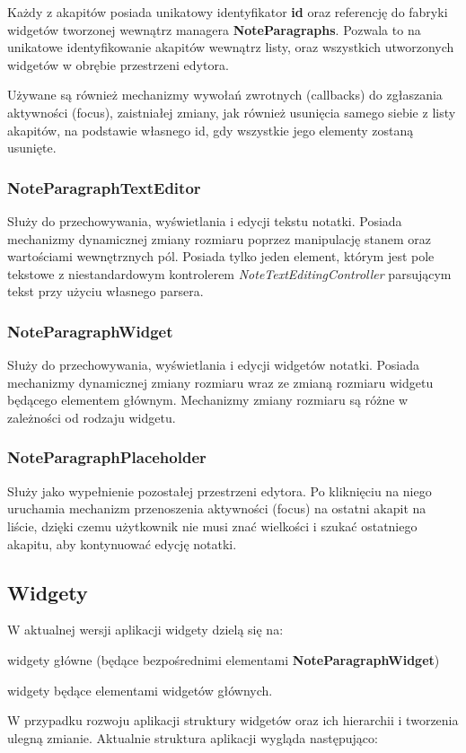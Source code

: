 Każdy z akapitów posiada unikatowy identyfikator \textbf{id} oraz referencję do fabryki widgetów tworzonej wewnątrz managera \textbf{NoteParagraphs}.
Pozwala to na unikatowe identyfikowanie akapitów wewnątrz listy, oraz wszystkich utworzonych widgetów w obrębie przestrzeni edytora.

Używane są również mechanizmy wywołań zwrotnych (callbacks) do zgłaszania aktywności (focus), zaistniałej zmiany, jak również usunięcia samego siebie z listy akapitów, na podstawie własnego id, gdy wszystkie jego elementy zostaną usunięte.

\subsubsection{NoteParagraphTextEditor}

Służy do przechowywania, wyświetlania i edycji tekstu notatki. Posiada mechanizmy dynamicznej zmiany rozmiaru poprzez manipulację stanem oraz wartościami wewnętrznych pól. Posiada tylko jeden element, którym jest pole tekstowe z niestandardowym kontrolerem \textit{NoteTextEditingController} parsującym tekst przy użyciu własnego parsera.

\subsubsection{NoteParagraphWidget}

Służy do przechowywania, wyświetlania i edycji widgetów notatki. Posiada mechanizmy dynamicznej zmiany rozmiaru wraz ze zmianą rozmiaru widgetu będącego elementem głównym. Mechanizmy zmiany rozmiaru są różne w zależności od rodzaju widgetu.

\subsubsection{NoteParagraphPlaceholder}

Służy jako wypełnienie pozostałej przestrzeni edytora. Po kliknięciu na niego uruchamia mechanizm przenoszenia aktywności (focus) na ostatni akapit na liście, dzięki czemu użytkownik nie musi znać wielkości i szukać ostatniego akapitu, aby kontynuować edycję notatki.

\newpage

\subsection{Widgety}

W aktualnej wersji aplikacji widgety dzielą się na:
\begin{compactitem}
    \item widgety główne (będące bezpośrednimi elementami \textbf{NoteParagraphWidget})
    \item widgety będące elementami widgetów głównych.
\end{compactitem}
W przypadku rozwoju aplikacji struktury widgetów oraz ich hierarchii i tworzenia ulegną zmianie. Aktualnie struktura aplikacji wygląda następująco:

